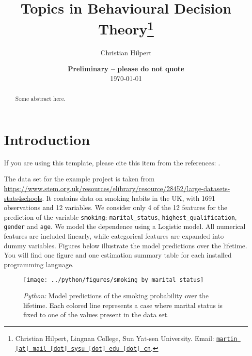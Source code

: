 \documentclass[11pt, a4paper, leqno]{article}
\begin{document}
\title{Topics in Behavioural Decision  Theory\thanks{Christian Hilpert, Lingnan College, Sun Yat-sen University. Email: \href{mailto:martin@mail.sysu.edu.cn}{\nolinkurl{martin [at] mail [dot] sysu [dot] edu [dot] cn}}.}}

\author{Christian Hilpert}

\date{
    {\bf Preliminary -- please do not quote}
    \\[1ex]
    \today
}

\maketitle


\begin{abstract}
    Some abstract here.
\end{abstract}

\clearpage


\section{Introduction} %
\label{sec:introduction}

If you are using this template, please cite this item from the references:
\citet{GaudeckerEconProjectTemplates}.

The data set for the example project is taken from
\url{https://www.stem.org.uk/resources/elibrary/resource/28452/large-datasets-stats4schools}.
It contains data on smoking habits in the UK, with 1691 observations and 12 variables.
We consider only 4 of the 12 features for the prediction of the variable
\texttt{smoking}: \texttt{marital\_status}, \texttt{highest\_qualification},
\texttt{gender} and \texttt{age}. We model the dependence using a Logistic model. All
numerical features are included linearly, while categorical features are expanded into
dummy variables. Figures below illustrate the model predictions over the lifetime. You
will find one figure and one estimation summary table for each installed programming
language.



\begin{figure}[H]

    \centering
    \texttt{[image: ../python/figures/smoking\_by\_marital\_status]}

    \caption{\emph{Python:} Model predictions of the smoking probability over the
        lifetime. Each colored line represents a case where marital status is fixed to one
        of the values present in the data set.}
    \label{fig:python-predictions}

\end{figure}
\end{document}
